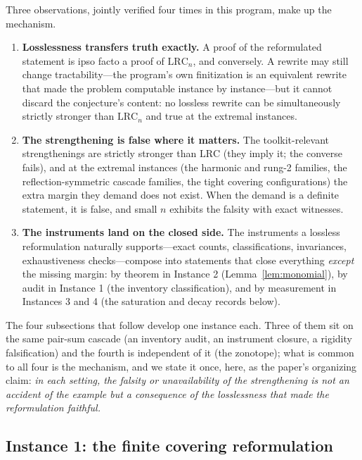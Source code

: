 \documentclass[11pt,a4paper]{article}
\numberwithin{equation}{section}
\theoremstyle{plain}
\theoremstyle{definition}
\theoremstyle{remark}
\newcommand{\lrc}{\mathrm{LRC}}
\begin{document}
Three observations, jointly verified four times in this program, make up
the mechanism.

\begin{enumerate}[leftmargin=1.6em,itemsep=2pt]
\item \textbf{Losslessness transfers truth exactly.} A proof of the
reformulated statement is ipso facto a proof of $\lrc_n$, and conversely.
A rewrite may still change tractability---the program's own finitization
is an equivalent rewrite that made the problem computable instance by
instance---but it cannot discard the conjecture's content: no lossless
rewrite can be simultaneously strictly stronger than $\lrc_n$ and true
at the extremal instances.
\item \textbf{The strengthening is false where it matters.} The
toolkit-relevant strengthenings are strictly stronger than $\lrc$ (they
imply it; the converse fails), and at the extremal instances (the
harmonic and rung-2 families, the reflection-symmetric cascade families,
the tight covering configurations) the extra margin they demand does not
exist. When the demand is a definite statement, it is false, and small
$n$ exhibits the falsity with exact witnesses.
\item \textbf{The instruments land on the closed side.} The instruments a
lossless reformulation naturally supports---exact counts,
classifications, invariances, exhaustiveness checks---compose into
statements that close everything \emph{except} the missing margin: by
theorem in Instance 2 (Lemma~\ref{lem:monomial}), by audit in Instance 1
(the inventory classification), and by measurement in Instances 3 and 4
(the saturation and decay records below).
\end{enumerate}

The four subsections that follow develop one instance each. Three of
them sit on the same pair-sum cascade (an inventory audit, an instrument
closure, a rigidity falsification) and the fourth is independent of it
(the zonotope); what is common to all four is the mechanism, and we
state it once, here, as the paper's organizing claim: \emph{in each
setting, the falsity or unavailability of the strengthening is not an
accident of the example but a consequence of the losslessness that made
the reformulation faithful.}

\subsection{Instance 1: the finite covering reformulation}\label{sec:tm-covering}
\end{document}
